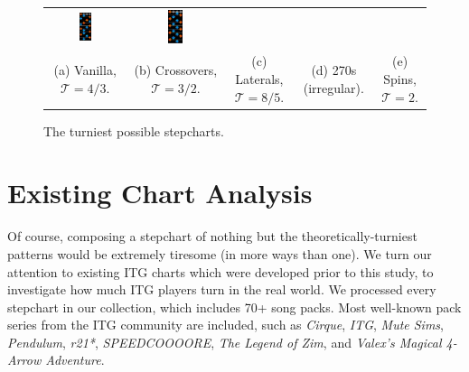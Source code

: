 \documentclass[10pt]{sigplanconf}
\begin{document}
\begin{figure}[t]
\begin{center}
\begin{tabular}{ccccc}
		\includegraphics[width=0.17\textwidth]{result-irregular-270.png} &
		\includegraphics[width=0.17\textwidth]{result-2-spin.png} \\
		\small (a) Vanilla, $\mathcal{T}=4/3$. &
		\small (b) Crossovers, $\mathcal{T}=3/2$. &
		\small (c) Laterals, $\mathcal{T}=8/5$. &
		\small (d) 270s (irregular). &
		\small (e) Spins, $\mathcal{T}=2$.
	\end{tabular}
	\end{center}
	\caption{The turniest possible stepcharts.}
	\label{fig:sequences}
\end{figure}


\section{Existing Chart Analysis}

Of course, composing a stepchart of nothing but the theoretically-turniest patterns would be extremely tiresome (in more ways than one).
We turn our attention to existing ITG charts which were developed prior to this study, to investigate how much ITG players turn in the real world.
We processed every stepchart in our collection, which includes 70+ song packs.
Most well-known pack series from the ITG community are included, such as {\em Cirque}, {\em ITG}, {\em Mute Sims}, {\em Pendulum}, {\em r21*}, {\em SPEEDCOOOORE}, {\em The Legend of Zim}, and {\em Valex's Magical 4-Arrow Adventure}.
\end{document}
